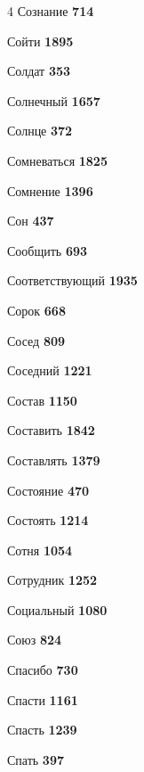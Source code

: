 \begin{multicols}{4}
\noindent Сознание \dotfill \textbf{\color{secondary} 714}\par
\noindent Сойти \dotfill \textbf{\color{secondary} 1895}\par
\noindent Солдат \dotfill \textbf{\color{secondary} 353}\par
\noindent Солнечный \dotfill \textbf{\color{secondary} 1657}\par
\noindent Солнце \dotfill \textbf{\color{secondary} 372}\par
\noindent Сомневаться \dotfill \textbf{\color{secondary} 1825}\par
\noindent Сомнение \dotfill \textbf{\color{secondary} 1396}\par
\noindent Сон \dotfill \textbf{\color{secondary} 437}\par
\noindent Сообщить \dotfill \textbf{\color{secondary} 693}\par
\noindent Соответствующий \dotfill \textbf{\color{secondary} 1935}\par
\noindent Сорок \dotfill \textbf{\color{secondary} 668}\par
\noindent Сосед \dotfill \textbf{\color{secondary} 809}\par
\noindent Соседний \dotfill \textbf{\color{secondary} 1221}\par
\noindent Состав \dotfill \textbf{\color{secondary} 1150}\par
\noindent Составить \dotfill \textbf{\color{secondary} 1842}\par
\noindent Составлять \dotfill \textbf{\color{secondary} 1379}\par
\noindent Состояние \dotfill \textbf{\color{secondary} 470}\par
\noindent Состоять \dotfill \textbf{\color{secondary} 1214}\par
\noindent Сотня \dotfill \textbf{\color{secondary} 1054}\par
\noindent Сотрудник \dotfill \textbf{\color{secondary} 1252}\par
\noindent Социальный \dotfill \textbf{\color{secondary} 1080}\par
\noindent Союз \dotfill \textbf{\color{secondary} 824}\par
\noindent Спасибо \dotfill \textbf{\color{secondary} 730}\par
\noindent Спасти \dotfill \textbf{\color{secondary} 1161}\par
\noindent Спасть \dotfill \textbf{\color{secondary} 1239}\par
\noindent Спать \dotfill \textbf{\color{secondary} 397}\par

\end{multicols}

